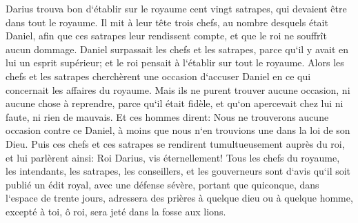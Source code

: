 \verse Darius trouva bon d`établir sur le royaume cent vingt satrapes, qui devaient être dans tout le royaume. 
\verse Il mit à leur tête trois chefs, au nombre desquels était Daniel, afin que ces satrapes leur rendissent compte, et que le roi ne souffrît aucun dommage. 
\verse Daniel surpassait les chefs et les satrapes, parce qu`il y avait en lui un esprit supérieur; et le roi pensait à l`établir sur tout le royaume. 
\verse Alors les chefs et les satrapes cherchèrent une occasion d`accuser Daniel en ce qui concernait les affaires du royaume. Mais ils ne purent trouver aucune occasion, ni aucune chose à reprendre, parce qu`il était fidèle, et qu`on apercevait chez lui ni faute, ni rien de mauvais. 
\verse Et ces hommes dirent: Nous ne trouverons aucune occasion contre ce Daniel, à moins que nous n`en trouvions une dans la loi de son Dieu. 
\verse Puis ces chefs et ces satrapes se rendirent tumultueusement auprès du roi, et lui parlèrent ainsi: Roi Darius, vis éternellement! 
\verse Tous les chefs du royaume, les intendants, les satrapes, les conseillers, et les gouverneurs sont d`avis qu`il soit publié un édit royal, avec une défense sévère, portant que quiconque, dans l`espace de trente jours, adressera des prières à quelque dieu ou à quelque homme, excepté à toi, ô roi, sera jeté dans la fosse aux lions. 

